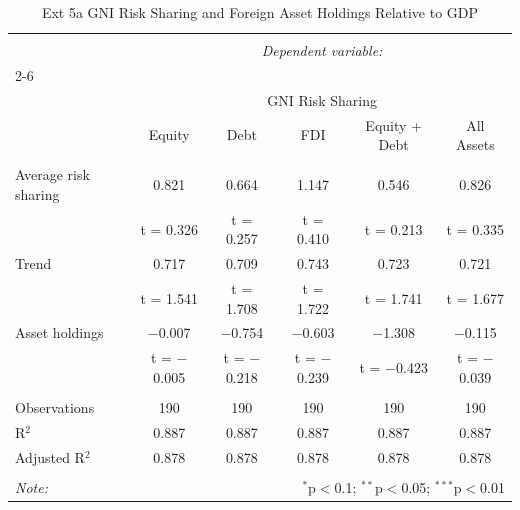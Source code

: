 
\begin{table}[!htbp] \centering 
  \caption{Ext 5a GNI Risk Sharing and Foreign Asset Holdings Relative to GDP} 
  \label{} 
\begin{tabular}{@{\extracolsep{5pt}}lccccc} 
\\[-1.8ex]\hline 
\hline \\[-1.8ex] 
 & \multicolumn{5}{c}{\textit{Dependent variable:}} \\ 
\cline{2-6} 
\\[-1.8ex] & \multicolumn{5}{c}{GNI Risk Sharing} \\ 
 & Equity & Debt & FDI & Equity + Debt & All Assets \\ 
\hline \\[-1.8ex] 
 Average risk sharing & 0.821 & 0.664 & 1.147 & 0.546 & 0.826 \\ 
  & t = 0.326 & t = 0.257 & t = 0.410 & t = 0.213 & t = 0.335 \\ 
  Trend & 0.717 & 0.709 & 0.743 & 0.723 & 0.721 \\ 
  & t = 1.541 & t = 1.708 & t = 1.722 & t = 1.741 & t = 1.677 \\ 
  Asset holdings & $-$0.007 & $-$0.754 & $-$0.603 & $-$1.308 & $-$0.115 \\ 
  & t = $-$0.005 & t = $-$0.218 & t = $-$0.239 & t = $-$0.423 & t = $-$0.039 \\ 
 \hline \\[-1.8ex] 
Observations & 190 & 190 & 190 & 190 & 190 \\ 
R$^{2}$ & 0.887 & 0.887 & 0.887 & 0.887 & 0.887 \\ 
Adjusted R$^{2}$ & 0.878 & 0.878 & 0.878 & 0.878 & 0.878 \\ 
\hline 
\hline \\[-1.8ex] 
\textit{Note:}  & \multicolumn{5}{r}{$^{*}$p$<$0.1; $^{**}$p$<$0.05; $^{***}$p$<$0.01} \\ 
\end{tabular} 
\end{table} 
